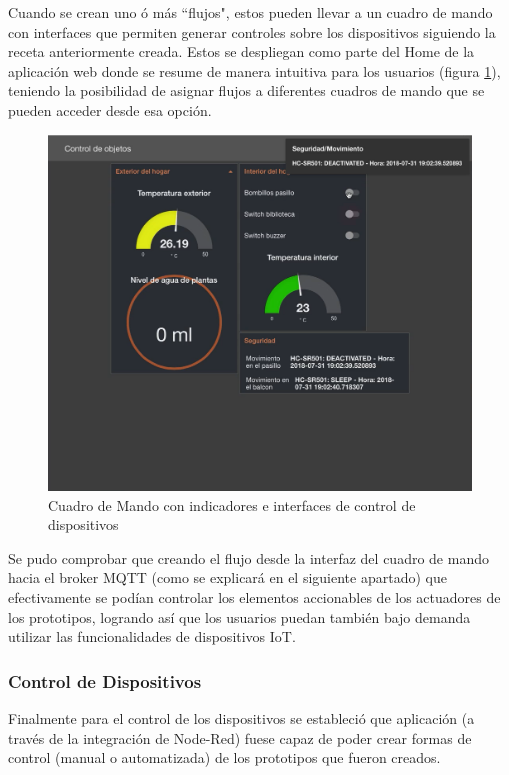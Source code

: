 Cuando se crean uno ó más ``flujos", estos pueden llevar a un cuadro de mando con interfaces que permiten generar controles sobre los dispositivos siguiendo la receta anteriormente creada. Estos se despliegan como parte del Home de la aplicación web donde se resume de manera intuitiva para los usuarios (figura \ref{fig:node_red_ui}), teniendo la posibilidad de asignar flujos a diferentes cuadros de mando que se pueden acceder desde esa opción.\\

\begin{figure}[htb]
\centering
\includegraphics[scale=0.315]{./Figuras/node_red_ui.png}
\caption{Cuadro de Mando con indicadores e interfaces de control de dispositivos}
\label{fig:node_red_ui}
\vspace*{-10pt}
\end{figure}

Se pudo comprobar que creando el flujo desde la interfaz del cuadro de mando hacia el broker MQTT (como se explicará en el siguiente apartado) que efectivamente se podían controlar los elementos accionables de los actuadores de los prototipos, logrando así que los usuarios puedan también bajo demanda utilizar las funcionalidades de dispositivos IoT.

\subsubsection{Control de Dispositivos}
Finalmente para el control de los dispositivos se estableció que aplicación (a través de la integración de Node-Red) fuese capaz de poder crear formas de control (manual o automatizada) de los prototipos que fueron creados.\\

